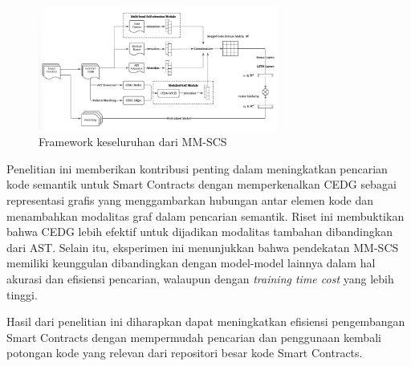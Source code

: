 \begin{figure}[ht]
  \centering
  \includegraphics[width=0.7\textwidth]{resources/chapter-2/framework-mm-scs.png}
  \caption{Framework keseluruhan dari MM-SCS \parencite{shi2021semantic}}
  \label{image:framework-mm-scs}
\end{figure}

Penelitian ini memberikan kontribusi penting dalam meningkatkan pencarian kode semantik untuk Smart Contracts dengan memperkenalkan CEDG sebagai representasi grafis yang menggambarkan hubungan antar elemen kode dan menambahkan modalitas graf dalam pencarian semantik. Riset ini membuktikan bahwa CEDG lebih efektif untuk dijadikan modalitas tambahan dibandingkan dari AST. Selain itu, eksperimen ini menunjukkan bahwa pendekatan MM-SCS memiliki keunggulan dibandingkan dengan model-model lainnya dalam hal akurasi dan efisiensi pencarian, walaupun dengan \textit{training time cost} yang lebih tinggi.

Hasil dari penelitian ini diharapkan dapat meningkatkan efisiensi pengembangan Smart Contracts dengan mempermudah pencarian dan penggunaan kembali potongan kode yang relevan dari repositori besar kode Smart Contracts.